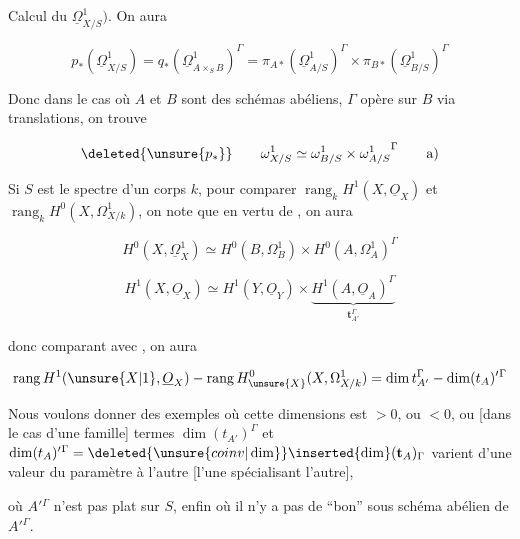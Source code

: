 \makeatletter\tagsleft@true\makeatother
Calcul du  $\underline{\Omega}^{1}_{X/S})$. On aura


\[
p_*(\underline{\Omega}^{1}_{X/S})
=q_*(\underline{\Omega}^{1}_{A\times_S B})^{\Gamma}
=\pi_{A*}(\underline{\Omega}^{1}_{A/S})^{\Gamma}\times\pi_{B*}(\underline{\Omega}^{1}_{B/S})^{\Gamma}
\]

Donc dans le cas  où $A$ et $B$ sont des schémas abéliens,  $\Gamma$ opère sur $B$ via translations, on trouve

\[
\deleted{\unsure{p_*}}\qquad \omega^{1}_{X/S}\simeq\omega^{1}_{B/S}\times{\omega^{1}_{A/S}}^{\Gamma}
\tag*{a)}
\]

Si $S$ est le spectre d'un corps $k$, pour comparer $\operatorname{rang}_k H^1(X,\underline{O}_X)$ et $\operatorname{rang}_k H^0(X,\Omega^1_{X/k})$, on note  que en vertu de , on aura

\[
H^0(X,\underline{\Omega}^1_X)\simeq H^0(B,\Omega^1_B)\times H^0(A,\Omega^1_A)^\Gamma
\tag*{a$'$)}
\]

\[
H^1(X,\underline{O}_X)\simeq H^1(Y,\underline{O}_Y)\times\underbrace{H^1(A,\underline{O}_A)^\Gamma}_{\mathbf{t}_{A'}^\Gamma}
\tag*{b$'$)}
\]

donc comparant avec , on aura

\[
\operatorname{rang} H^1(\unsure{X|1},\underline{O}_X)-\operatorname{rang} H^0_{\unsure{X}}(X,\Omega^1_{X/k})=\dim t_{A'}^\Gamma-\dim(t_A)'{}^\Gamma
\]

Nous voulons donner des exemples où cette  dimensions est $>0$, ou $<0$,  ou [dans le cas d'une famille]  termes  $\dim(t_{A'})^\Gamma$ et $\dim(t_A)'{}^\Gamma=\deleted{\unsure{coinv|\dim}}\inserted{\dim}(\mathbf{t}_A)_\Gamma$ varient d'une valeur du paramètre à l'autre \deleted{[\unsure{pour un}} [l'une spécialisant l'autre],


où $A'{}^\Gamma$ n'est pas plat sur $S$, enfin où il n'y a pas de ``bon'' sous schéma abélien de $A'{}^\Gamma$.

